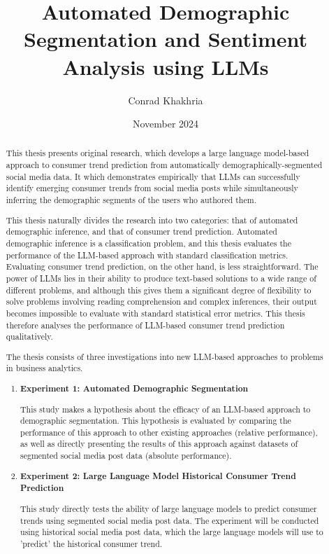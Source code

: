 \documentclass{report}
\title{\textbf{Automated Demographic Segmentation and Sentiment Analysis using LLMs}}
\author{Conrad Khakhria}
\date{November 2024}
\begin{document}
\maketitle

\begin{abstract}
This thesis presents original research, which develops a large language model-based approach to consumer trend prediction from automatically demographically-segmented social media data. It which demonstrates empirically that LLMs can successfully identify emerging consumer trends from social media posts while simultaneously inferring the demographic segments of the users who authored them.

This thesis naturally divides the research into two categories: that of automated demographic inference, and that of consumer trend prediction. Automated demographic inference is a classification problem, and this thesis evaluates the performance of the LLM-based approach with standard classification metrics. Evaluating consumer trend prediction, on the other hand, is less straightforward. The power of LLMs lies in their ability to produce text-based solutions to a wide range of different problems, and although this gives them a significant degree of flexibility to solve problems involving reading comprehension and complex inferences, their output becomes impossible to evaluate with standard statistical error metrics. This thesis therefore analyses the performance of LLM-based consumer trend prediction qualitatively.

The thesis consists of three investigations into new LLM-based approaches to problems in business analytics.

\begin{enumerate}
\item \textbf{Experiment 1: Automated Demographic Segmentation}

This study makes a hypothesis about the efficacy of an LLM-based approach to demographic segmentation. This hypothesis is evaluated by comparing the performance of this approach to other existing approaches (relative performance), as well as directly presenting the results of this approach against datasets of segmented social media post data (absolute performance).

\item \textbf{Experiment 2: Large Language Model Historical Consumer Trend Prediction}

This study directly tests the ability of large language models to predict consumer trends using segmented social media post data. The experiment will be conducted using historical social media post data, which the large language models will use to 'predict' the historical consumer trend.


\end{enumerate}
\end{abstract}
\end{document}
